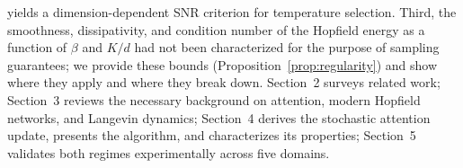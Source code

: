 yields a dimension-dependent SNR criterion for temperature selection. Third, the smoothness, dissipativity, and condition number of the Hopfield energy as a function of $\beta$ and $K/d$ had not been characterized for the purpose of sampling guarantees; we provide these bounds (Proposition~\ref{prop:regularity}) and show where they apply and where they break down. Section~2 surveys related work; Section~3 reviews the necessary background on attention, modern Hopfield networks, and Langevin dynamics; Section~4 derives the stochastic attention update, presents the algorithm, and characterizes its properties; Section~5 validates both regimes experimentally across five domains.
